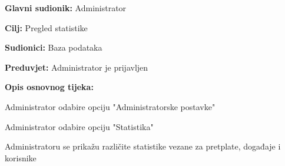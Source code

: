 					\noindent {}
					\begin{packed_item}
	
						\item \textbf{Glavni sudionik:} Administrator
						\item  \textbf{Cilj:} Pregled statistike
						\item  \textbf{Sudionici:} Baza podataka
						\item  \textbf{Preduvjet:} Administrator je prijavljen
						\item  \textbf{Opis osnovnog tijeka:}
						
						\item[] \begin{packed_enum}
	
							\item Administrator odabire opciju "Administratorske postavke"
							\item Administrator odabire opciju "Statistika"
							\item Administratoru se prikažu različite statistike vezane za pretplate, događaje i korisnike
						\end{packed_enum}
					\end{packed_item}

